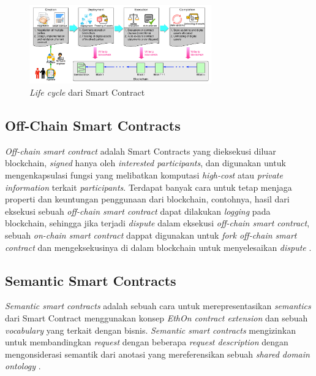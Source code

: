 \begin{figure}
	\centering
	\includegraphics[width=0.7\textwidth]{resources/chapter-2/sc-lifecycle.png}
	\caption{\textit{Life cycle} dari Smart Contract \parencite{zheng2020overview}}
	\label{image:sc-lifecycle}
\end{figure}

\subsection{Off-Chain Smart Contracts}
\label{subsec:off-chain-smart-contracts}

\textit{Off-chain smart contract} adalah Smart Contracts yang dieksekusi diluar blockchain, \textit{signed} hanya oleh \textit{interested participants}, dan digunakan untuk mengenkapsulasi fungsi yang melibatkan komputasi \textit{high-cost} atau \textit{private information} terkait \textit{participants}. Terdapat banyak cara untuk tetap menjaga properti dan keuntungan penggunaan dari blockchain, contohnya, hasil dari eksekusi sebuah \textit{off-chain smart contract} dapat dilakukan \textit{logging} pada blockchain, sehingga jika terjadi \textit{dispute} dalam eksekusi \textit{off-chain smart contract}, sebuah \textit{on-chain smart contract} dappat digunakan untuk \textit{fork off-chain smart contract} dan mengeksekusinya di dalam blockchain untuk menyelesaikan \textit{dispute} \parencite{zou2019smart}.

\subsection{Semantic Smart Contracts}
\label{subsec:semantic-smart-contracts}
\textit{Semantic smart contracts} adalah sebuah cara untuk merepresentasikan \textit{semantics} dari Smart Contract menggunakan konsep \textit{EthOn contract extension} dan sebuah \textit{vocabulary} yang terkait dengan bisnis. \textit{Semantic smart contracts} mengizinkan untuk membandingkan \textit{request} dengan beberapa \textit{request description} dengan mengonsiderasi semantik dari anotasi yang mereferensikan sebuah \textit{shared domain ontology} \parencite{baqa2019semantic}.
